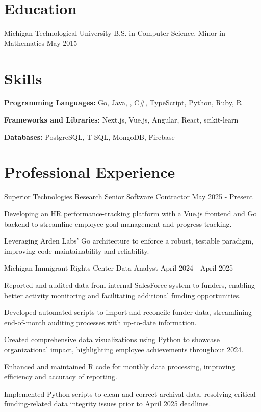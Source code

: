 \documentclass{../styles/resume}
\begin{document}
\populatedtitle

\section{Education}
\subsectionlocationdate
    {Michigan Technological University}
    {B.S. in Computer Science, Minor in Mathematics}
    {May 2015}

\section{Skills}
\resumesublistbegin
    \item \textbf{Programming Languages:} Go, Java, \cpp, C\#, TypeScript, Python, Ruby, R
    \item \textbf{Frameworks and Libraries:} Next.js, Vue.js, Angular, React, scikit-learn
    \item \textbf{Databases:} PostgreSQL, T-SQL, MongoDB, Firebase
\resumesublistend

\section{Professional Experience}

\subsectionpositiondate
    {Superior Technologies Research}
    {Senior Software Contractor}
    {May 2025 - Present}
\resumesublistbegin
    \item Developing an HR performance-tracking platform with a Vue.js frontend and Go backend to streamline employee goal management and progress tracking.
    \item Leveraging Arden Labs' Go architecture to enforce a robust, testable paradigm, improving code maintainability and reliability.
\resumesublistend

\subsectionpositiondate
    {Michigan Immigrant Rights Center}
    {Data Analyst}
    {April 2024 - April 2025}
\resumesublistbegin
    \item Reported and audited data from internal SalesForce system to funders, enabling better activity monitoring and facilitating additional funding opportunities.
    \item Developed automated scripts to import and reconcile funder data, streamlining end-of-month auditing processes with up-to-date information.
    \item Created comprehensive data visualizations using Python to showcase organizational impact, highlighting employee achievements throughout 2024.
    \item Enhanced and maintained R code for monthly data processing, improving efficiency and accuracy of reporting.
    \item Implemented Python scripts to clean and correct archival data, resolving critical funding-related data integrity issues prior to April 2025 deadlines.
\resumesublistend
\end{document}
